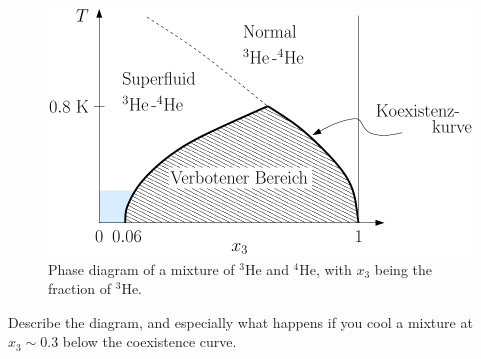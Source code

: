 \documentclass[11pt,a4paper]{article}
\begin{document}
\begin{figure}[h!]
\centering
\begin{minipage}{6cm}
  \caption{Phase diagram of a mixture of $^3$He and $^4$He, with $x_3$ being the
    fraction of $^3$He.}
  \label{helium}
\end{minipage}
\hspace*{1cm}
\begin{minipage}{7cm}
  \includegraphics[width=\textwidth]{fig/helium_big}
\end{minipage}
\end{figure}

Describe the diagram, and especially what happens if you cool a mixture at $x_3\sim0.3$
below the coexistence curve.
\end{document}
